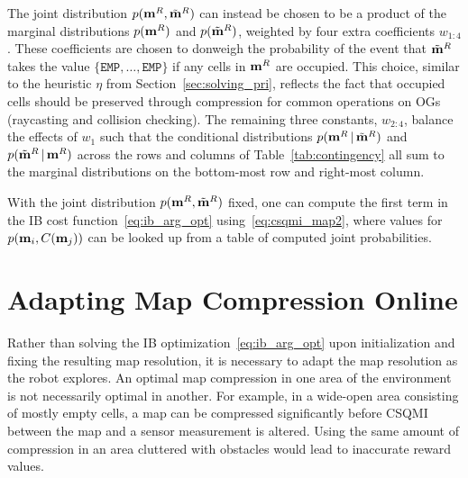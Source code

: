 The joint distribution $p(\mathbf{m}^{R},\tilde{\mathbf{m}}^{R})$ can instead be
chosen to be a product of the marginal distributions $p(\mathbf{m}^{R})$ and $p(\tilde{\mathbf{m}}^R)$, weighted
by four extra coefficients $w_{1:4}$. These coefficients are chosen to donweigh
the probability of the event that $\tilde{\mathbf{m}}^{R}$ takes the value
$\{\texttt{EMP},\dots,\texttt{EMP}\}$ if any cells in $\mathbf{m}^{R}$ are
occupied. This choice, similar to the heuristic $\eta$ from
Section~\ref{sec:solving_pri}, reflects the fact that occupied cells should be
preserved through compression for common operations on OGs (raycasting
and collision checking). The remaining three constants, $w_{2:4}$, balance the effects
of $w_{1}$ such that the conditional distributions $p(\mathbf{m}^{R} \, \vert \,
\tilde{\mathbf{m}}^{R})$ and $p(\tilde{\mathbf{m}}^{R} \, \vert \, \mathbf{m}^{R})$ across the rows
and columns of Table~\ref{tab:contingency} all sum to the marginal
distributions on the bottom-most row and right-most column.

With the joint distribution $p(\mathbf{m}^{R}, \tilde{\mathbf{m}}^{R})$ fixed, one can
compute the first term in the IB cost function~\eqref{eq:ib_arg_opt}
using~\eqref{eq:csqmi_map2}, where values for $p(\mathbf{m}_{i},C(\mathbf{m}_{j}))$
can be looked up from a table of computed joint probabilities.
%

\section{Adapting Map Compression Online}
\label{sec:adapting}

Rather than solving the IB optimization~\eqref{eq:ib_arg_opt} upon initialization
and fixing the resulting map resolution, it is necessary to adapt the map
resolution as the robot explores.
An optimal map compression in one area of the
environment is not necessarily optimal in another. For example, in a wide-open
area consisting of mostly empty cells, a map can be compressed
significantly before CSQMI between the map and a sensor measurement is altered.
Using the same amount of compression in an area cluttered with obstacles would
lead to inaccurate reward values.

